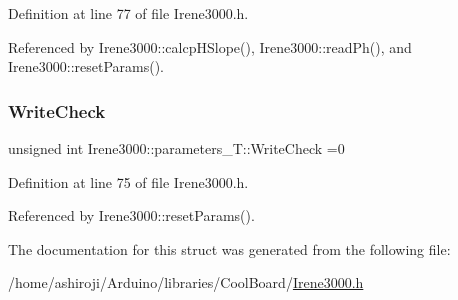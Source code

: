 Definition at line 77 of file Irene3000.\+h.



Referenced by Irene3000\+::calcp\+H\+Slope(), Irene3000\+::read\+Ph(), and Irene3000\+::reset\+Params().

\mbox{\label{structIrene3000_1_1parameters__T_a56f1f14d33a69300d580eda2dc52cecd}} 
\subsubsection{\texorpdfstring{Write\+Check}{WriteCheck}}
{\footnotesize\ttfamily unsigned int Irene3000\+::parameters\+\_\+\+T\+::\+Write\+Check =0}



Definition at line 75 of file Irene3000.\+h.



Referenced by Irene3000\+::reset\+Params().



The documentation for this struct was generated from the following file\+:\begin{DoxyCompactItemize}
\item 
/home/ashiroji/\+Arduino/libraries/\+Cool\+Board/\hyperlink{Irene3000_8h}{Irene3000.\+h}\end{DoxyCompactItemize}
